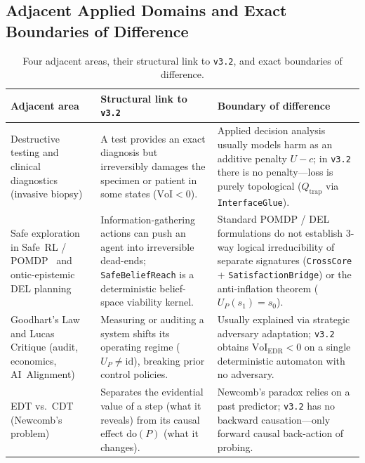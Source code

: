 \documentclass[10pt,a4paper]{article}
\theoremstyle{cleanthm}
\theoremstyle{cleandef}
\begin{document}
\subsection{Adjacent Applied Domains and Exact Boundaries of Difference}

\begin{table}[!htbp]
\centering
\caption{Four adjacent areas, their structural link to \texttt{v3.2}, and exact boundaries of difference.}
\label{tab:adjacent_domains}
\footnotesize
\begin{tabularx}{\linewidth}{@{}>{\raggedright\arraybackslash}p{40mm} >{\raggedright\arraybackslash}X >{\raggedright\arraybackslash}X@{}}
\toprule
\textbf{Adjacent area} & \textbf{Structural link to \texttt{v3.2}} & \textbf{Boundary of difference} \\
\midrule
Destructive testing and clinical diagnostics (invasive biopsy) & A test provides an exact diagnosis but irreversibly damages the specimen or patient in some states ($\mathrm{VoI}<0$). & Applied decision analysis usually models harm as an additive penalty $U-c$; in \texttt{v3.2} there is no penalty—loss is purely topological ($Q_{\mathrm{trap}}$ via \texttt{InterfaceGlue}). \\
Safe exploration in Safe~RL / POMDP~\cite{bonet2000,moldovan2012,aubin1991} and ontic-epistemic DEL planning~\cite{vanditmarsch2007,bolander2011} & Information-gathering actions can push an agent into irreversible dead-ends; \texttt{SafeBeliefReach} is a deterministic belief-space viability kernel. & Standard POMDP / DEL formulations do not establish 3-way logical irreducibility of separate signatures (\texttt{CrossCore} + \texttt{Satisfaction\allowbreak Bridge}) or the anti-inflation theorem ($U_P(s_1)=s_0$). \\
Goodhart's Law and Lucas Critique (audit, economics, AI~Alignment) & Measuring or auditing a system shifts its operating regime ($U_P\ne\mathrm{id}$), breaking prior control policies. & Usually explained via strategic adversary adaptation; \texttt{v3.2} obtains $\mathrm{VoI}_{\mathrm{EDR}}<0$ on a single deterministic automaton with no adversary. \\
EDT vs.\ CDT (Newcomb's problem) & Separates the evidential value of a step (what it reveals) from its causal effect $\mathrm{do}(P)$ (what it changes). & Newcomb's paradox relies on a past predictor; \texttt{v3.2} has no backward causation—only forward causal back-action of probing. \\
\bottomrule
\end{tabularx}
\end{table}
\end{document}
